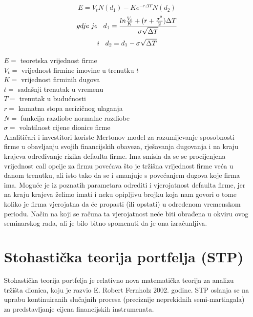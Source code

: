 \documentclass[times, utf8, seminar]{fer}
\begin{document}
\[ E = V_tN(d_1) - K e^{-r\Delta T}N(d_2)\]
\[ gdje \hspace{0.1cm} je \hspace{0.3cm} d_1 = \frac{ln \frac{V_t}{K} + (r+\frac{\sigma^2}{2})\Delta T}{\sigma\sqrt{\Delta T}} \]
\[ i \hspace{0.3cm} d_2 = d_1 - \sigma\sqrt{\Delta T}\]

\noindent $E =$ teoretska vrijednost firme \\
$V_t =$ vrijednost firmine imovine u trenutku $t$\\
$K =$ vrijednost firminih dugova\\
$t =$ sadašnji trenutak u vremenu\\
$T =$ trenutak u budućnosti\\
$r =$ kamatna stopa nerizičnog ulaganja\\
$N =$ funkcija razdiobe normalne razdiobe\\
$\sigma =$ volatilnost cijene dionice firme\\

Analitičari i investitori koriste Mertonov model za razumijevanje sposobnosti firme u obavljanju svojih financijskih obaveza, rješavanja dugovanja i na kraju krajeva određivanje rizika defaulta firme. Ima smisla da se se procijenjena vrijednost call opcije za firmu povećava što je tržišna vrijednost firme veća u danom trenutku, ali isto tako da se i smanjuje s povećanjem dugova koje firma ima. Moguće je iz poznatih parametara odrediti i vjerojatnost defaulta firme, jer na kraju krajeva želimo imati i neku opipljivu brojku koja nam govori o tome koliko je firma vjerojatna da će propasti (ili opstati) u određenom vremenskom periodu. Način na koji se računa ta vjerojatnost neće biti obrađena u okviru ovog seminarskog rada, ali je bilo bitno spomenuti da je ona izračunljiva.


\chapter{Stohastička teorija portfelja (STP)}
Stohastička teorija portfelja je relativno nova matematička teorija za analizu tržišta dionica, koju je razvio E. Robert Fernholz 2002. godine. STP oslanja se na uprabu kontinuiranih slučajnih procesa (preciznije neprekidnih semi-martingala) za predstavljanje cijena financijskih instrumenata.
\end{document}
